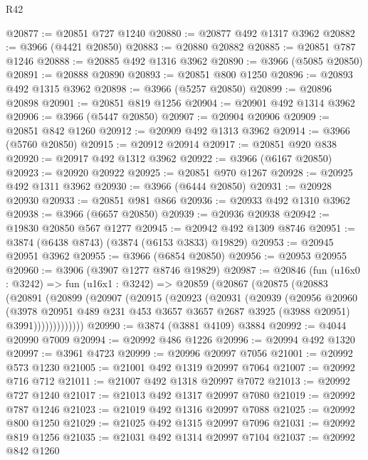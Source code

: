 \begin{lexlean}{R42}
\begin{coremodule}
@20877 := @20851 @727 @1240
@20880 := @20877 @492 @1317 @3962
@20882 := @3966 (@4421 @20850)
@20883 := @20880 @20882
@20885 := @20851 @787 @1246
@20888 := @20885 @492 @1316 @3962
@20890 := @3966 (@5085 @20850)
@20891 := @20888 @20890
@20893 := @20851 @800 @1250
@20896 := @20893 @492 @1315 @3962
@20898 := @3966 (@5257 @20850)
@20899 := @20896 @20898
@20901 := @20851 @819 @1256
@20904 := @20901 @492 @1314 @3962
@20906 := @3966 (@5447 @20850)
@20907 := @20904 @20906
@20909 := @20851 @842 @1260
@20912 := @20909 @492 @1313 @3962
@20914 := @3966 (@5760 @20850)
@20915 := @20912 @20914
@20917 := @20851 @920 @838
@20920 := @20917 @492 @1312 @3962
@20922 := @3966 (@6167 @20850)
@20923 := @20920 @20922
@20925 := @20851 @970 @1267
@20928 := @20925 @492 @1311 @3962
@20930 := @3966 (@6444 @20850)
@20931 := @20928 @20930
@20933 := @20851 @981 @866
@20936 := @20933 @492 @1310 @3962
@20938 := @3966 (@6657 @20850)
@20939 := @20936 @20938
@20942 := @19830 @20850 @567 @1277
@20945 := @20942 @492 @1309 @8746
@20951 := @3874 (@6438 @8743) (@3874 (@6153 @3833) @19829)
@20953 := @20945 @20951 @3962
@20955 := @3966 (@6854 @20850)
@20956 := @20953 @20955
@20960 := @3906 (@3907 @1277 @8746 @19829)
@20987 := @20846
    (fun (u16x0 : @3242) =>
    fun (u16x1 : @3242) =>
    @20859
      (@20867
        (@20875
          (@20883
            (@20891
              (@20899
                (@20907
                  (@20915
                    (@20923
                      (@20931
                        (@20939
                          (@20956
                            @20960
                            (@3978
                              @20951
                              @489
                              @231
                              @453
                              @3657
                              @3657
                              @2687
                              @3925
                              (@3988 @20951)
                              @3991)))))))))))))
@20990 := @3874 (@3881 @4109) @3884
@20992 := @4044 @20990 @7009
@20994 := @20992 @486 @1226
@20996 := @20994 @492 @1320
@20997 := @3961 @4723
@20999 := @20996 @20997 @7056
@21001 := @20992 @573 @1230
@21005 := @21001 @492 @1319 @20997 @7064
@21007 := @20992 @716 @712
@21011 := @21007 @492 @1318 @20997 @7072
@21013 := @20992 @727 @1240
@21017 := @21013 @492 @1317 @20997 @7080
@21019 := @20992 @787 @1246
@21023 := @21019 @492 @1316 @20997 @7088
@21025 := @20992 @800 @1250
@21029 := @21025 @492 @1315 @20997 @7096
@21031 := @20992 @819 @1256
@21035 := @21031 @492 @1314 @20997 @7104
@21037 := @20992 @842 @1260

\end{coremodule}
\end{lexlean}
